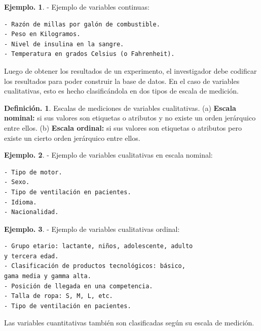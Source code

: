 \documentclass[]{book}
\theoremstyle{definition}
\newtheorem{definition}{Definición.}[chapter]
\theoremstyle{definition}
\newtheorem{example}{Ejemplo.}[chapter]
\theoremstyle{definition}
\theoremstyle{remark}
\begin{document}
\begin{example}
\protect\hypertarget{exm:unnamed-chunk-27}{}{\label{exm:unnamed-chunk-27} }- Ejemplo de variables continuas:

\begin{verbatim}
- Razón de millas por galón de combustible. 
- Peso en Kilogramos.
- Nivel de insulina en la sangre.
- Temperatura en grados Celsius (o Fahrenheit).
\end{verbatim}
\end{example}

Luego de obtener los resultados de un experimento, el
investigador debe codificar los resultados para poder
construir la base de datos. En el caso de variables
cualitativas, esto es hecho clasificándola en dos tipos
de escala de medición.

\begin{definition}
\protect\hypertarget{def:unnamed-chunk-28}{}{\label{def:unnamed-chunk-28} }Escalas de mediciones de variables cualitativas. (a)
\textbf{Escala nominal:} si sus valores son
etiquetas o atributos y no existe un orden jerárquico
entre ellos. (b) \textbf{Escala ordinal:} si sus
valores son etiquetas o atributos pero existe un cierto
orden jerárquico entre ellos.
\end{definition}

\begin{example}
\protect\hypertarget{exm:unnamed-chunk-29}{}{\label{exm:unnamed-chunk-29} }- Ejemplo de variables cualitativas en escala nominal:

\begin{verbatim}
- Tipo de motor.
- Sexo.
- Tipo de ventilación en pacientes.  
- Idioma.
- Nacionalidad.
\end{verbatim}
\end{example}

\begin{example}
\protect\hypertarget{exm:unnamed-chunk-30}{}{\label{exm:unnamed-chunk-30} }- Ejemplo de variables cualitativas ordinal:

\begin{verbatim}
- Grupo etario: lactante, niños, adolescente, adulto
y tercera edad.
- Clasificación de productos tecnológicos: básico,
gama media y gamma alta. 
- Posición de llegada en una competencia.
- Talla de ropa: S, M, L, etc. 
- Tipo de ventilación en pacientes.   
\end{verbatim}
\end{example}

Las variables cuantitativas también son clasificadas
según su escala de medición.
\end{document}
